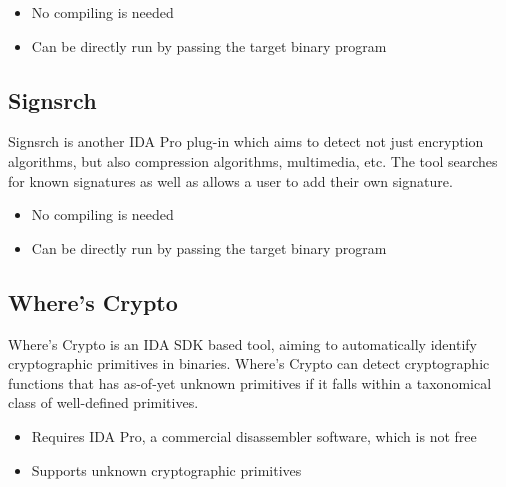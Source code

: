 \begin{itemize}
  \item No compiling is needed
  \item Can be directly run by passing the target binary program
\end{itemize}

\subsection{Signsrch} 
  Signsrch \cite{signsrch}  is another IDA Pro plug-in which aims to detect not just encryption algorithms, but also compression algorithms, multimedia, etc. The tool searches for known signatures as well as allows a user to add their own signature.

\begin{itemize}
  \item No compiling is needed
  \item Can be directly run by passing the target binary program
\end{itemize}

\subsection{Where's Crypto} 
 Where's Crypto \cite{meijer2021s} is an IDA SDK based tool, aiming to automatically identify cryptographic primitives in binaries. Where's Crypto can detect cryptographic functions that has as-of-yet unknown primitives if it falls within a taxonomical class of well-defined primitives.

\begin{itemize}
  \item Requires IDA Pro, a commercial disassembler software, which is not free
  \item Supports unknown cryptographic primitives
\end{itemize}




